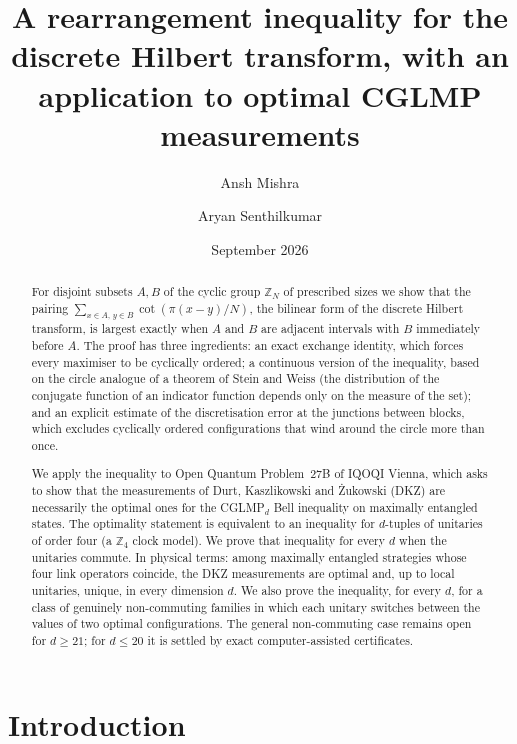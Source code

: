 \documentclass[11pt]{amsart}
\theoremstyle{definition}
\theoremstyle{remark}
\newcommand{\Z}{\mathbb{Z}}
\begin{document}
\title[Discrete Hilbert transform rearrangement and CGLMP]{A rearrangement inequality for the discrete Hilbert
transform, with an application to optimal CGLMP measurements}

\author{Ansh Mishra}
\author{Aryan Senthilkumar}

\date{September 2026}

\begin{abstract}
For disjoint subsets $A,B$ of the cyclic group $\Z_N$ of prescribed sizes we show that the pairing
$\sum_{x\in A,\,y\in B}\cot(\pi(x-y)/N)$, the bilinear form of the discrete Hilbert transform, is largest
exactly when $A$ and $B$ are adjacent intervals with $B$ immediately before $A$. The proof has three
ingredients: an exact exchange identity, which forces every maximiser to be cyclically ordered; a continuous
version of the inequality, based on the circle analogue of a theorem of Stein and Weiss (the distribution of the
conjugate function of an indicator function depends only on the measure of the set); and an explicit estimate of
the discretisation error at the junctions between blocks, which excludes cyclically ordered configurations that
wind around the circle more than once.

We apply the inequality to Open Quantum Problem~27B of IQOQI Vienna, which asks to show that the measurements
of Durt, Kaszlikowski and \.Zukowski (DKZ) are necessarily the optimal ones for the CGLMP$_d$ Bell inequality on
maximally entangled states. The optimality statement is equivalent to an inequality for $d$-tuples of unitaries of
order four (a $\Z_4$ clock model). We prove that inequality for every $d$ when the unitaries commute. In physical
terms: among maximally entangled strategies whose four link operators coincide, the DKZ measurements are optimal
and, up to local unitaries, unique, in every dimension $d$. We also prove the inequality, for every $d$, for a class
of genuinely non-commuting families in which each unitary switches between the values of two optimal
configurations. The general non-commuting case remains open for $d\ge 21$; for $d\le 20$ it is settled by
exact computer-assisted certificates.
\end{abstract}

\maketitle

\section{Introduction}\label{sec:intro}
\end{document}
